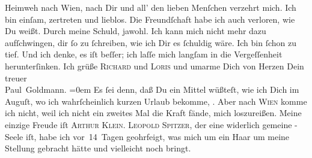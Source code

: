 \begin{ledgroupsized}[t]{13cm}
               Heimweh nach Wien, nach Dir und all’ {\pb}den lieben Menſchen verzehrt mich. Ich bin einſam,
               zertreten und lieblos. Die Freundſchaft habe ich auch verloren, wie Du weißt. Durch
               meine Schuld, jawohl. Ich kann mich nicht mehr dazu aufſchwingen, dir ſo zu
               ſchreiben, wie ich Dir es ſchuldig wäre. Ich bin ſchon zu tief. Und ich denke, es iſt
               beſſer; ich laſſe mich langſam in die Vergeſſenheit herunterſinken.\pend
           \pstart
           Ich grüße \textsc{Richard} und \textsc{Loris} und
               umarme Dich von Herzen\pend
           \pstart
           Dein {\\[\baselineskip]}treuer {\\[\baselineskip]}\spacefill\mbox{Paul Goldmann.}\pend
           \leftskip=0em{}\pstart
           \noindent{}{\pb}Es ſei denn, daß Du ein Mittel wüßteſt, wie ich
                  Dich im Auguſt, wo ich wahrſcheinlich kurzen Urlaub
                  bekomme, \label{K_L02698-4v}\label{K_L02698-4h}. Aber nach \textsc{Wien} komme ich nicht, weil ich nicht ein zweites Mal die Kraft fände, mich
                  loszureißen.\pend
           \pstart
           Meine einzige Freude iſt \textsc{Arthur Klein}. \textsc{Leopold Spitzer}, der eine widerlich gemeine \label{K_L02698-5v}\label{K_L02698-5h}-Seele iſt, habe ich
                  vor 14 Tagen geohrfeigt, was mich um ein Haar um meine Stellung gebracht hätte und
                  vielleicht noch bringt.\pend
           \endnumbering{}\end{ledgroupsized}  \newcommand{\dateiname}{L02698}\newcommand{\titel}{Paul Goldmann an Arthur Schnitzler, 24. 6. [1892]}\newcommand{\editorInnen}{Martin Anton Müller und Laura Untner}
            \footnotesize
\begin{ledgroupsized}[t]{11.5cm}
\end{ledgroupsized}
         
      